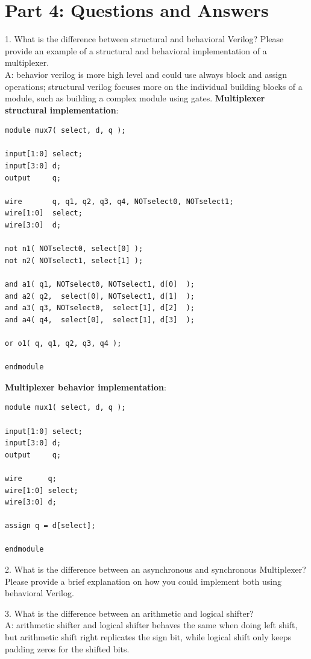 \documentclass{article}
\begin{document}
\section{Part 4: Questions and Answers}
1. What is the difference between structural and behavioral Verilog? Please provide an example of a structural and behavioral implementation of a multiplexer.\\
A: behavior verilog is more high level and could use always block and assign operations; structural verilog focuses more on the individual building blocks of a module, such as building a complex module using gates.  \textbf{Multiplexer structural implementation}: 
\begin{verbatim}
module mux7( select, d, q );

input[1:0] select;
input[3:0] d;
output     q;

wire       q, q1, q2, q3, q4, NOTselect0, NOTselect1;
wire[1:0]  select;
wire[3:0]  d;

not n1( NOTselect0, select[0] );
not n2( NOTselect1, select[1] );

and a1( q1, NOTselect0, NOTselect1, d[0]  );
and a2( q2,  select[0], NOTselect1, d[1]  );
and a3( q3, NOTselect0,  select[1], d[2]  );
and a4( q4,  select[0],  select[1], d[3]  );

or o1( q, q1, q2, q3, q4 );

endmodule
\end{verbatim}

\textbf{Multiplexer behavior implementation}: 
\begin{verbatim}
module mux1( select, d, q );

input[1:0] select;
input[3:0] d;
output     q;

wire      q;
wire[1:0] select;
wire[3:0] d;

assign q = d[select];

endmodule
\end{verbatim}

\vspace{10mm}
2. What is the difference between an asynchronous and synchronous Multiplexer? Please provide a brief explanation on how you could implement both using behavioral Verilog.\\
\vspace{10mm}

3. What is the difference between an arithmetic and logical shifter? \\
A: arithmetic shifter and logical shifter behaves the same when doing left shift, but arithmetic shift right replicates the sign bit, while logical shift only keeps padding zeros for the shifted bits. 
\vspace{10mm}
\end{document}
